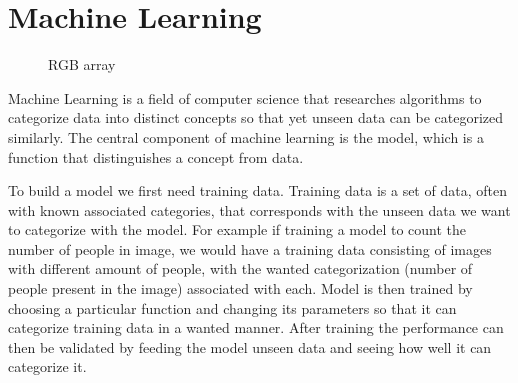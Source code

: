 \documentclass[12pt,a4paper,english
]{tunithesis}
\begin{document}
\section{Machine Learning}
\begin{figure}
  \centering
  \caption{RGB array}
  \label{fig:rgb-array}
\end{figure}

Machine Learning is a field of computer science that researches algorithms to categorize data into distinct concepts so that yet unseen data can be categorized similarly. The central component of machine learning is the model, which is a function that distinguishes a concept from data.

To build a model we first need training data. Training data is a set of data, often with known associated categories, that corresponds with the unseen data we want to categorize with the model. For example if training a model to count the number of people in image, we would have a training data consisting of images with different amount of people, with the wanted categorization (number of people present in the image) associated with each. Model is then trained by choosing a particular function and changing its parameters so that it can categorize training data in a wanted manner. After training the performance can then be validated by feeding the model unseen data and seeing how well it can categorize it.
\end{document}
